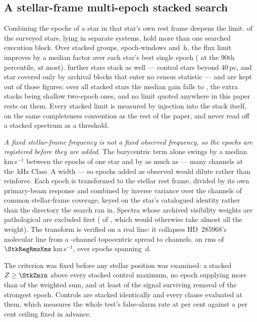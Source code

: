 \subsection{A stellar-frame multi-epoch stacked search}
\label{sec:stack}

Combining the epochs of a star in that star's own rest frame deepens the
limit. \SxStkStarCensus{} of the surveyed stars, lying in \SxStkSysCensus{}
separate systems, hold more than one searched execution block. Over
\SyStkNGroup{} stacked groups, \SyStkNEpochComb{} epoch-windows and
\SyStkHours\,h, the flux limit improves by a median factor \SyStkGainMed{}
over each star's best single epoch (\SyStkGainPNinety{} at the 90th
percentile, \SyStkGainMax{} at most). \SxStkStarOutside{} further stars
stack as well --- \SyStkStarOos{} control stars beyond 40\,pc, and
\SyStkStarOther{} star covered only by archival blocks that enter no census
statistic --- and are kept out of those figures: over all \StkNStar{} stacked
stars the median gain falls to \StkLimitGainMed{}, the extra stacks being
shallow two-epoch ones, and no limit quoted anywhere in this paper rests on
them. Every stacked limit is measured by injection into the stack itself, on
the same completeness convention as the rest of the paper, and never read off
a stacked spectrum as a threshold.

\emph{A fixed stellar-frame frequency is not a fixed observed frequency, so
the epochs are registered before they are added.} The barycentric term alone
swings by a median \StkVcorrSwingMed\,km\,s$^{-1}$ between the epochs of one
star and by as much as \StkVcorrSwingMax --- many channels at the
\StkRefChanKHz\,kHz Class~A width --- so epochs added as observed would dilute
rather than reinforce. Each epoch is transformed to the stellar rest frame,
divided by its own primary-beam response and combined by inverse variance
over the channels of common stellar-frame coverage, keyed on the star's
catalogued identity rather than the directory the search ran in. Spectra
whose archived visibility weights are pathological are excluded first
(\StkBadWeight{} of \StkNProd, which would otherwise take almost all the
weight). The transform is verified on a real line: it collapses HD~285968's
molecular line from a \StkRegTopoChan-channel topocentric spread to
\StkRegStellarChan{} channels, an rms of $\StkRegRmsKms$\,km\,s$^{-1}$, over
\StkRegNEpoch{} epochs spanning \StkRegSpanD\,d.

The criterion was fixed before any stellar position was examined: a stacked
$Z\ge\StkZmin$ above every stacked control maximum, no epoch supplying more
than \StkDomMax{} of the weighted sum, and at least \StkJkMin{} of the signal
surviving removal of the strongest epoch. Controls are stacked identically
and every clause evaluated at them, which measures the whole test's
false-alarm rate at \StkCtrlFap{} per cent against a \StkFapCeil{} per cent
ceiling fixed in advance.

